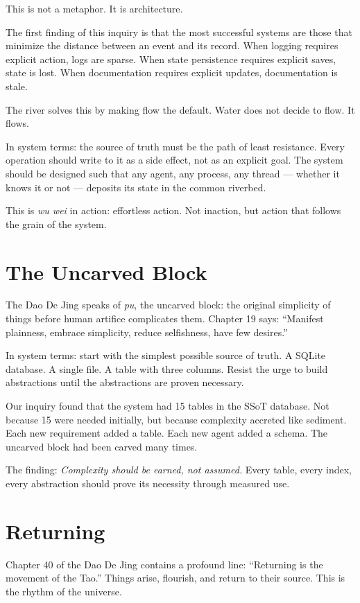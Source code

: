 \documentclass[12pt,a4paper,oneside]{book}
\begin{document}
This is not a metaphor. It is architecture.

The first finding of this inquiry is that the most successful systems are those that minimize the distance between an event and its record. When logging requires explicit action, logs are sparse. When state persistence requires explicit saves, state is lost. When documentation requires explicit updates, documentation is stale.

The river solves this by making flow the default. Water does not decide to flow. It flows.

In system terms: the source of truth must be the path of least resistance. Every operation should write to it as a side effect, not as an explicit goal. The system should be designed such that any agent, any process, any thread --- whether it knows it or not --- deposits its state in the common riverbed.

This is \emph{wu wei} in action: effortless action. Not inaction, but action that follows the grain of the system.

\section{The Uncarved Block}

The Dao De Jing speaks of \emph{pu}, the uncarved block: the original simplicity of things before human artifice complicates them. Chapter 19 says: \enquote{Manifest plainness, embrace simplicity, reduce selfishness, have few desires.}

In system terms: start with the simplest possible source of truth. A SQLite database. A single file. A table with three columns. Resist the urge to build abstractions until the abstractions are proven necessary.

Our inquiry found that the system had 15 tables in the SSoT database. Not because 15 were needed initially, but because complexity accreted like sediment. Each new requirement added a table. Each new agent added a schema. The uncarved block had been carved many times.

The finding: \emph{Complexity should be earned, not assumed.} Every table, every index, every abstraction should prove its necessity through measured use.

\section{Returning}

Chapter 40 of the Dao De Jing contains a profound line: \enquote{Returning is the movement of the Tao.} Things arise, flourish, and return to their source. This is the rhythm of the universe.
\end{document}
